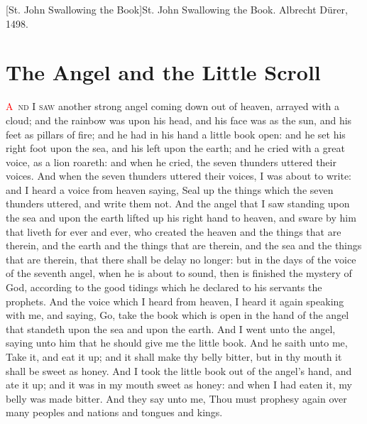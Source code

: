 [St. John Swallowing the Book]{St. John Swallowing the Book. Albrecht Dürer, 1498.}

\chapter{The Angel and the Little Scroll}
\lettrine[lines=3,slope=-0.5em]{\textcolor{red}{A}}{\ nd I saw} another strong angel coming down out of heaven, arrayed with a cloud; and the rainbow was upon his head, and his face was as the sun, and his feet as pillars of fire; 
 and he had in his hand a little book open: and he set his right foot upon the sea, and his left upon the earth; 
 and he cried with a great voice, as a lion roareth: and when he cried, the seven thunders uttered their voices. 
 And when the seven thunders uttered their voices, I was about to write: and I heard a voice from heaven saying, Seal up the things which the seven thunders uttered, and write them not. 
 And the angel that I saw standing upon the sea and upon the earth lifted up his right hand to heaven, 
 and sware by him that liveth for ever and ever, who created the heaven and the things that are therein, and the earth and the things that are therein, and the sea and the things that are therein, that there shall be delay no longer: 
 but in the days of the voice of the seventh angel, when he is about to sound, then is finished the mystery of God, according to the good tidings which he declared to his servants the prophets. 
 And the voice which I heard from heaven, I heard it again speaking with me, and saying, Go, take the book which is open in the hand of the angel that standeth upon the sea and upon the earth. 
 And I went unto the angel, saying unto him that he should give me the little book. And he saith unto me, Take it, and eat it up; and it shall make thy belly bitter, but in thy mouth it shall be sweet as honey. 
 And I took the little book out of the angel’s hand, and ate it up; and it was in my mouth sweet as honey: and when I had eaten it, my belly was made bitter. 
 And they say unto me, Thou must prophesy again over many peoples and nations and tongues and kings.